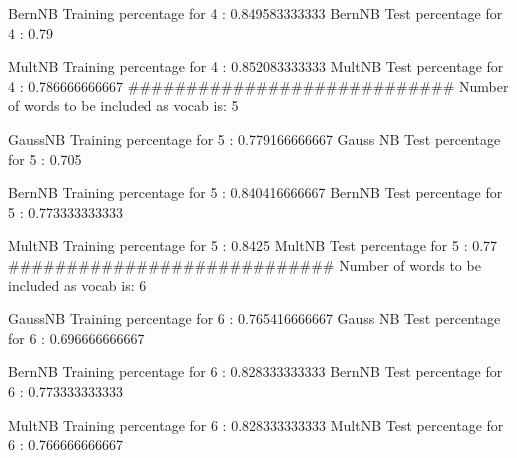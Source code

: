 BernNB Training percentage for 4 : 0.849583333333
BernNB Test percentage for 4 :     0.79

MultNB Training percentage for 4 : 0.852083333333
MultNB Test percentage for 4 :     0.786666666667
############################
Number of words to be included as vocab is: 5

GaussNB Training percentage for 5 : 0.779166666667
Gauss NB Test percentage for 5 :     0.705

BernNB Training percentage for 5 : 0.840416666667
BernNB Test percentage for 5 :     0.773333333333

MultNB Training percentage for 5 : 0.8425
MultNB Test percentage for 5 :     0.77
############################
Number of words to be included as vocab is: 6

GaussNB Training percentage for 6 : 0.765416666667
Gauss NB Test percentage for 6 :     0.696666666667

BernNB Training percentage for 6 : 0.828333333333
BernNB Test percentage for 6 :     0.773333333333

MultNB Training percentage for 6 : 0.828333333333
MultNB Test percentage for 6 :     0.766666666667